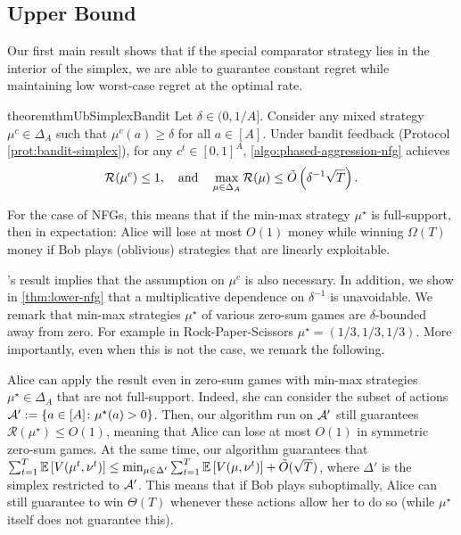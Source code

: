 \documentclass[11pt]{article}
\begin{document}
\subsection{Upper Bound} \label{sec:nfg-upper}

Our first main result shows that if the special comparator strategy lies in the interior of the simplex, we are able to guarantee constant regret while maintaining low worst-case regret at the optimal rate. 
\begin{restatable}{theorem}{thmUbSimplexBandit}\label{thm:ub-simplex-bandit}
    Let $\delta\in(0,1/A]$. Consider any mixed strategy $\mu^c\in \Delta_A$ such that $\mu^c(a)\geq \delta$ for all $a\in[A]$. Under bandit feedback (Protocol \ref{prot:bandit-simplex}), for any $c^t\in[0,1]^A$, \cref{algo:phased-aggression-nfg} achieves 
    \begin{align*}
        \mathcal{R}(\mu^c) \leq 1, \quad \text{and} \quad \max_{\mu\in\Delta_A} \mathcal{R}(\mu) \leq \tilde{O}\left( \delta^{-1}\sqrt{T} \right).
    \end{align*} 
\end{restatable}
For the case of NFGs, this means that if the min-max strategy $\mu^\star$ is full-support, then in expectation: Alice will lose at most $O(1)$ money while winning $\Omega(T)$ money if Bob plays (oblivious) strategies that are linearly exploitable.

\citet{lattimore2015pareto}'s result implies that the assumption on $\mu^c$ is also necessary. In addition, we show in \cref{thm:lower-nfg} that a multiplicative dependence on $\delta^{-1}$ is unavoidable. We remark that min-max strategies $\mu^\star$ of various zero-sum games are $\delta$-bounded away from zero. For example in Rock-Paper-Scissors $\mu^\star= (1/3,1/3,1/3)$. More importantly, even when this is not the case, we remark the following.
\begin{remark} \label{rmk:restrict}
    Alice can apply the result even in zero-sum games with min-max strategies $\mu^\star \in \Delta_A$ that are not full-support. Indeed, she can consider the subset of actions $\mathcal{A}':=\{a \in [A] \colon \mu^\star(a) > 0\}$. Then, our algorithm run on $\mathcal{A}'$ still guarantees $\mathcal{R}(\mu^\star)\leq O(1)$, meaning that Alice can lose at most $O(1)$ in symmetric zero-sum games. At the same time, our algorithm guarantees that $\sum_{t=1}^T \mathbb{E}\left[ V(\mu^t,\nu^t) \right] \leq \min_{\mu\in\Delta'} \sum_{t=1}^T \mathbb{E}\left[ V(\mu,\nu^t) \right] + \tilde{O}(\sqrt{T})$, where $\Delta'$ is the simplex restricted to $\mathcal{A}'$. This means that if Bob plays suboptimally, Alice can still guarantee to win $\Theta(T)$ whenever these actions allow her to do so (while $\mu^\star$ itself does not guarantee this).
\end{remark}
\end{document}
